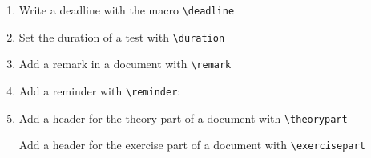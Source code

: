 \documentclass[12pt,a4page]{article}
\def\cellwidth{0.4\textwidth}
\newcommand{\miniexample}[3][t]{%
  \parbox[#1][#3][t]{\cellwidth}{#2}
}
\newcommand{\codeexample}[3][c]{%
  \colorbox[HTML]{b0c4be}{\miniexample[#1]{}{#3}}
}
\newcommand{\textexample}[3][c]{%
  {\footnotesize
    \colorbox[gray]{0.9}{\miniexample[#1]{}{#3}}%
  }
}
\newcommand{\examplerow}[3][10pt]{%
  \par\noindent\strut\hfill\codeexample{#2}{#3}\hspace{#1}\textexample{#2}{#3}\hfill\strut
}
\newlength{\exheight}
\begin{document}
\begin{enumerate}
  We can pass a date using the macros \verb|\setdate| and \verb|\getdate|.
  \examplerow{exampleMacroNameDate03.tex}{\exheight}
\item Write a deadline with the macro \verb|\deadline|
  \setlength{\exheight}{12pt}
  \examplerow{exampleMacroDeadline.tex}{\exheight}
\item Set the duration of a test with \verb|\duration|
  \setlength{\exheight}{36pt}
  \examplerow{exampleMacroDuration.tex}{\exheight}
\item Add a remark in a document with \verb|\remark|
  \setlength{\exheight}{36pt}
  \examplerow{exampleMacroRemark.tex}{\exheight}
\item Add a reminder with \verb|\reminder|:
  \setlength{\exheight}{24pt}
  \examplerow{exampleMacroReminder.tex}{\exheight}
\item Add a header for the theory part of a document with \verb|\theorypart|
  \setlength{\exheight}{32pt}
  \examplerow{exampleMacroTheorypart.tex}{\exheight}

  Add a header for the exercise part of a document with \verb|\exercisepart|
  \examplerow{exampleMacroExercisepart.tex}{\exheight}

  \newpage


\end{enumerate}
\end{document}
